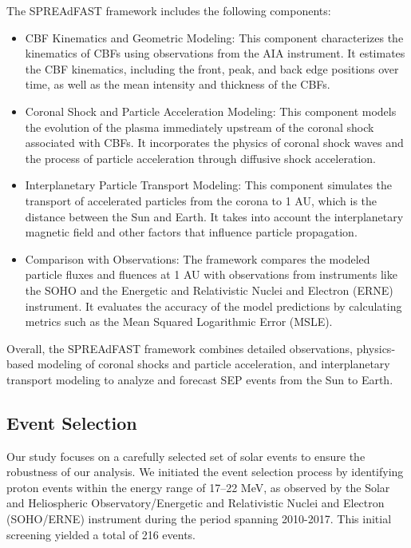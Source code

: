 The SPREAdFAST framework includes the following components:
\begin{itemize}
    \item CBF Kinematics and Geometric Modeling: This component characterizes the kinematics of CBFs using observations from the AIA instrument. It estimates the CBF kinematics, including the front, peak, and back edge positions over time, as well as the mean intensity and thickness of the CBFs.
    \item Coronal Shock and Particle Acceleration Modeling: This component models the evolution of the plasma immediately upstream of the coronal shock associated with CBFs. It incorporates the physics of coronal shock waves and the process of particle acceleration through diffusive shock acceleration.
    \item Interplanetary Particle Transport Modeling: This component simulates the transport of accelerated particles from the corona to 1 AU, which is the distance between the Sun and Earth. It takes into account the interplanetary magnetic field and other factors that influence particle propagation.
    \item Comparison with Observations: The framework compares the modeled particle fluxes and fluences at 1 AU with observations from instruments like the SOHO and the Energetic and Relativistic Nuclei and Electron (ERNE) instrument. It evaluates the accuracy of the model predictions by calculating metrics such as the Mean Squared Logarithmic Error (MSLE).
\end{itemize}
Overall, the SPREAdFAST framework combines detailed observations, physics-based modeling of coronal shocks and particle acceleration, and interplanetary transport modeling to analyze and forecast SEP events from the Sun to Earth.

\subsection{Event Selection}
Our study focuses on a carefully selected set of solar events to ensure the robustness of our analysis. We initiated the event selection process by identifying proton events within the energy range of 17–22 MeV, as observed by the Solar and Heliospheric Observatory/Energetic and Relativistic Nuclei and Electron (SOHO/ERNE) instrument during the period spanning 2010-2017. This initial screening yielded a total of 216 events.

